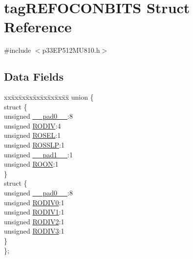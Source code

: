 \hypertarget{structtag_r_e_f_o_c_o_n_b_i_t_s}{}\section{tag\+R\+E\+F\+O\+C\+O\+N\+B\+I\+TS Struct Reference}
\label{structtag_r_e_f_o_c_o_n_b_i_t_s}


{\ttfamily \#include $<$p33\+E\+P512\+M\+U810.\+h$>$}

\subsection*{Data Fields}
\begin{DoxyCompactItemize}
\item 
\begin{tabbing}
xx\=xx\=xx\=xx\=xx\=xx\=xx\=xx\=xx\=\kill
union \{\\
\>struct \{\\
\>\>unsigned \hyperlink{structtag_r_e_f_o_c_o_n_b_i_t_s_adf71f3d8410c1f1dbbc96680a92c49af}{\_\_pad0\_\_}:8\\
\>\>unsigned \hyperlink{structtag_r_e_f_o_c_o_n_b_i_t_s_a2d7f0dd94a02aefcc34e93f6dc1fc9c2}{RODIV}:4\\
\>\>unsigned \hyperlink{structtag_r_e_f_o_c_o_n_b_i_t_s_ad99b621a5cbf3f2dd193e7f07d9dfb7b}{ROSEL}:1\\
\>\>unsigned \hyperlink{structtag_r_e_f_o_c_o_n_b_i_t_s_abcb605b9611f8a753739bf72e369a591}{ROSSLP}:1\\
\>\>unsigned \hyperlink{structtag_r_e_f_o_c_o_n_b_i_t_s_acaf2d0924a107ec6e8d2e31febaf66f9}{\_\_pad1\_\_}:1\\
\>\>unsigned \hyperlink{structtag_r_e_f_o_c_o_n_b_i_t_s_a5976f266c317997e5321bd960638ace4}{ROON}:1\\
\>\} \\
\>struct \{\\
\>\>unsigned \hyperlink{structtag_r_e_f_o_c_o_n_b_i_t_s_adf71f3d8410c1f1dbbc96680a92c49af}{\_\_pad0\_\_}:8\\
\>\>unsigned \hyperlink{structtag_r_e_f_o_c_o_n_b_i_t_s_a3da653f6006a9d6c95d2346b74e8f25d}{RODIV0}:1\\
\>\>unsigned \hyperlink{structtag_r_e_f_o_c_o_n_b_i_t_s_af9081f293a51e43f9c5da74b0d02b0cb}{RODIV1}:1\\
\>\>unsigned \hyperlink{structtag_r_e_f_o_c_o_n_b_i_t_s_aa95c163c704d0558f317ae9a8b5834fc}{RODIV2}:1\\
\>\>unsigned \hyperlink{structtag_r_e_f_o_c_o_n_b_i_t_s_ad691aef29229a6d145557ab01fda3370}{RODIV3}:1\\
\>\} \\
\}; \\

\end{tabbing}\end{DoxyCompactItemize}


